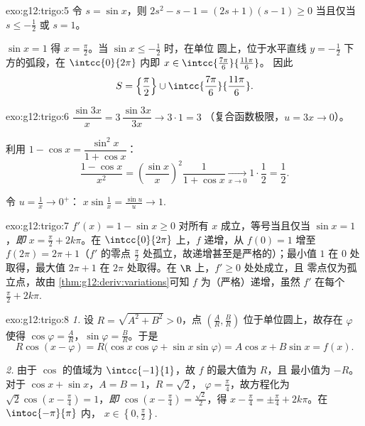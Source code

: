 \begin{solution}{exo:g12:trigo:5}
令 $s = \sin x$，则 $2s^2 - s - 1 = (2s + 1)(s - 1) \geq 0$ 当且仅当
$s \leq -\frac12$ 或 $s = 1$。

$\sin x = 1$ 得 $x = \frac\pi2$。当 $\sin x \leq -\frac12$ 时，在单位
圆上，位于水平直线 $y = -\frac12$ 下方的弧段，在
$\intcc{0}{2\pi}$ 内即 $x \in \intcc{\frac{7\pi}{6}}{\frac{11\pi}{6}}$。
因此
\[
S = \left\{\frac{\pi}{2}\right\} \cup
\intcc{\frac{7\pi}{6}}{\frac{11\pi}{6}} .
\]
\end{solution}

\begin{solution}{exo:g12:trigo:6}
$\dfrac{\sin 3x}{x} = 3\,\dfrac{\sin 3x}{3x} \to 3 \cdot 1 = 3$
（复合函数极限，$u = 3x \to 0$）。

利用 $1 - \cos x = \dfrac{\sin^2 x}{1 + \cos x}$：
\[
\frac{1 - \cos x}{x^2}
= \left(\frac{\sin x}{x}\right)^{\!2} \frac{1}{1 + \cos x}
\xrightarrow[x\to0]{} 1 \cdot \frac12 = \frac12 .
\]

令 $u = \frac1x \to 0^+$：
$x \sin\frac1x = \frac{\sin u}{u} \to 1$.
\end{solution}

\begin{solution}{exo:g12:trigo:7}
$f'(x) = 1 - \sin x \geq 0$ 对所有 $x$ 成立，等号当且仅当
$\sin x = 1$，\emph{即} $x = \frac\pi2 + 2k\pi$。在 $\intcc{0}{2\pi}$ 上，$f$
递增，从 $f(0) = 1$ 增至 $f(2\pi) = 2\pi + 1$（$f'$ 的零点
$\frac{\pi}{2}$ 处孤立，故递增甚至是严格的）；最小值 $1$ 在
$0$ 处取得，最大值 $2\pi + 1$ 在 $2\pi$ 处取得。在 $\R$ 上，$f' \geq 0$ 处处成立，且
零点仅为孤立点，故由
\cref{thm:g12:deriv:variations}可知 $f$ 为（严格）递增，虽然 $f'$ 在每个
$\frac\pi2 + 2k\pi$.
\end{solution}

\begin{solution}{exo:g12:trigo:8}
\emph{1.} 设 $R = \sqrt{A^2 + B^2} > 0$，点
$\left(\frac AR, \frac BR\right)$ 位于单位圆上，故存在
$\varphi$ 使得 $\cos\varphi = \frac AR$，$\sin\varphi = \frac BR$。于是
\[
R\cos(x - \varphi) = R\bigl(\cos x\cos\varphi + \sin x \sin\varphi\bigr)
= A\cos x + B\sin x = f(x).
\]

\emph{2.} 由于 $\cos$ 的值域为 $\intcc{-1}{1}$，故 $f$ 的最大值为 $R$，且
最小值为 $-R$。对于 $\cos x + \sin x$，$A = B = 1$，$R = \sqrt2$，
$\varphi = \frac\pi4$，故方程化为
$\sqrt2\cos\left(x - \frac\pi4\right) = 1$，\emph{即}
$\cos\left(x - \frac\pi4\right) = \frac{\sqrt2}{2}$，得
$x - \frac\pi4 = \pm\frac\pi4 + 2k\pi$。在 $\intoc{-\pi}{\pi}$ 内，
$x \in \left\{0, \frac\pi2\right\}$.
\end{solution}

